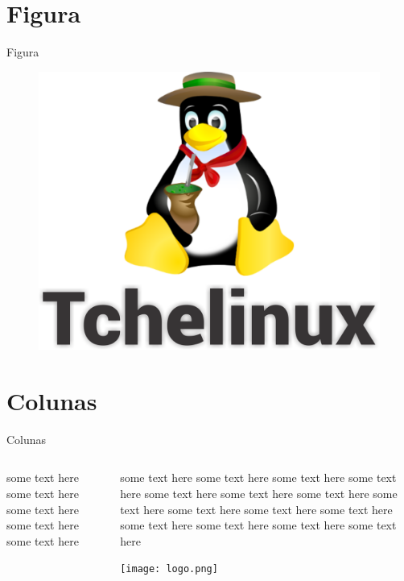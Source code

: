 \documentclass[aspectratio=1610]{beamer}
\begin{document}
\section{Figura}

\begin{frame}{Figura}

	\begin{figure}[!htb]
		\centering
		\includegraphics[scale=.45]{fig/fig_logo.png}
	\end{figure}

\end{frame}




\section{Colunas}
\begin{frame}{Colunas}

\begin{columns}
	\begin{column}{0.5\textwidth}
		some text here some text here some text here some text here some text here
	\end{column}
	\begin{column}{0.5\textwidth}  %
		some text here some text here some text here some text here some text here
		some text here some text here some text here some text here some text here
		some text here some text here some text here some text here some text here
		\begin{center}
			\texttt{[image: logo.png]}
		\end{center}
	\end{column}
\end{columns}

\end{frame}
\end{document}
